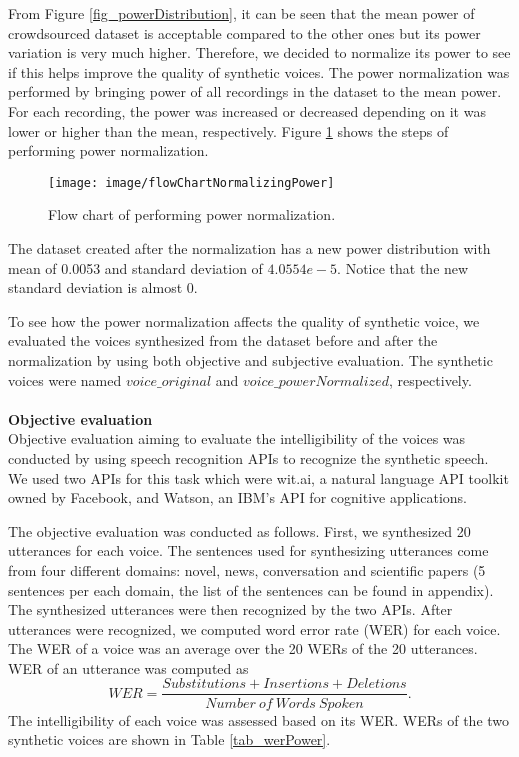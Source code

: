 \documentclass[12pt]{article}
\begin{document}
From Figure \ref{fig_powerDistribution}, it can be seen that the mean power of crowdsourced dataset is acceptable compared to the other ones but its power variation is very much higher. Therefore, we decided to normalize its power to see if this helps improve the quality of synthetic voices. The power normalization was performed by bringing power of all recordings in the dataset to the mean power. For each recording, the power was increased or decreased depending on it was lower or higher than the mean, respectively. Figure \ref{fig_normalizingPower} shows the steps of performing power normalization.
\begin{figure}[t]
\begin{center}
\texttt{[image: image/flowChartNormalizingPower]}
\end{center}
\vspace{-0.3cm}
\caption[Flow chart of performing power normalization.]{Flow chart of performing power normalization.}
\label{fig_normalizingPower}
\end{figure}
The dataset created after the normalization has a new power distribution with mean of 0.0053 and standard deviation of $4.0554e-5$. Notice that the new standard deviation is almost 0.

To see how the power normalization affects the quality of synthetic voice, we evaluated the voices synthesized from the dataset before and after the normalization by using both objective and subjective evaluation. The synthetic voices were named $voice\_original$ and $voice\_powerNormalized$, respectively.\\\\
\textbf{Objective evaluation}
\vspace{0.28cm}\\
Objective evaluation aiming to evaluate the intelligibility of the voices was conducted by using speech recognition APIs to recognize the synthetic speech. We used two APIs for this task which were wit.ai, a natural language API toolkit owned by Facebook, and Watson, an IBM’s API for cognitive applications.

The objective evaluation was conducted as follows. First, we synthesized 20 utterances for each voice. The sentences used for synthesizing utterances come from four different domains: novel, news, conversation and scientific papers (5 sentences per each domain, the list of the sentences can be found in appendix). The synthesized utterances were then recognized by the two APIs. After utterances were recognized, we computed word error rate (WER) for each voice. The WER of a voice was an average over the 20 WERs of the 20 utterances. WER of an utterance was computed as
\begin{equation}\label{exp_wer}
    WER = \frac{Substitutions + Insertions + Deletions}{Number\:of\:Words\:Spoken}.
\end{equation}
The intelligibility of each voice was assessed based on its WER. WERs of the two synthetic voices are shown in Table \ref{tab_werPower}.
\end{document}
